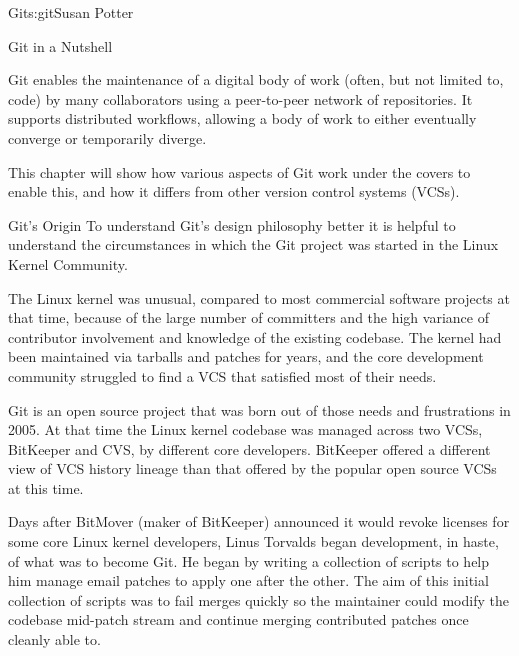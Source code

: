 \begin{aosachapter}{Git}{s:git}{Susan Potter}

\begin{aosasect1}{Git in a Nutshell}

Git enables the maintenance of a digital body of work (often, but not limited
to, code) by many collaborators using a peer-to-peer network of
repositories. It supports distributed workflows, allowing a
body of work to either eventually converge or temporarily diverge.

This chapter will show how various aspects of Git work under the covers
to enable this, and how it differs from other version control systems (VCSs).

\end{aosasect1}

\begin{aosasect1}{Git's Origin}
To understand Git's design philosophy better it is helpful to understand the
circumstances in which the Git project was started in the Linux Kernel
Community. 

The Linux kernel was unusual, compared to most commercial software projects at that
time, because of the large number of committers and the high variance of
contributor involvement and knowledge of the existing
codebase. 
The kernel had been maintained via tarballs and patches for years, and  
the core development community struggled to find a VCS that
satisfied most of their needs.

Git is an open source project that was born out of those needs and
frustrations in 2005. At that time
the Linux kernel codebase was managed across two VCSs, BitKeeper
and CVS, by different core developers. BitKeeper offered a different
view of VCS history lineage than that offered by the popular open source VCSs at this
time.

Days after BitMover (maker of BitKeeper) announced it would revoke licenses
for some core Linux kernel developers, Linus Torvalds began development, in
haste, of what was to become Git. He began by writing a
collection of scripts to help him manage email patches to apply one after
the other. The aim of this initial collection of scripts was to fail merges
quickly so the maintainer could modify the codebase mid-patch stream and
continue merging contributed patches once cleanly able to.


\end{aosasect1}
\end{aosachapter}
